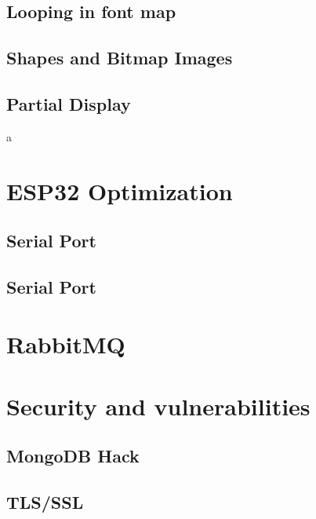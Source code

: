\documentclass[../Main.tex]{subfiles}
\begin{document}
\subsection{Looping in font map}
\subsection{Shapes and Bitmap Images}
\subsection{Partial Display}
a
\section{ESP32 Optimization}
\subsection{Serial Port}
\subsection{Serial Port}

\section{RabbitMQ}

\section{Security and vulnerabilities}
\subsection{MongoDB Hack}
\subsection{TLS/SSL}



\end{document}
